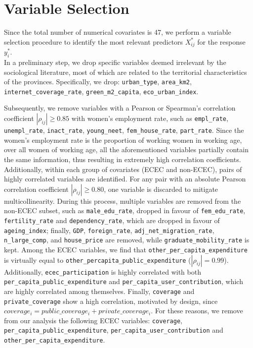 \section{Variable Selection}
\label{sec:variable_selection}

Since the total number of numerical covariates is 47, we perform a variable selection procedure to identify the most relevant predictors $X_{ij}^*$ for the response $y_i^*$.\\

In a preliminary step, we drop specific variables deemed irrelevant by the sociological literature, most of which are related to the territorial characteristics of the provinces. Specifically, we drop: \texttt{urban\_type}, \texttt{area\_km2}, \texttt{internet\_coverage\_rate}, \texttt{green\_m2\_capita}, \texttt{eco\_urban\_index}.

Subsequently, we remove variables with a Pearson or Spearman's correlation coefficient $|\rho_{ij}| \ge 0.85$ with women's employment rate, such as \texttt{empl\_rate}, \texttt{unempl\_rate}, \texttt{inact\_rate}, \texttt{young\_neet}, \texttt{fem\_house\_rate}, \texttt{part\_rate}. Since the women's employment rate is the proportion of working women in working age, over all women of working age, all the aforementioned variables partially contain the same information, thus resulting in extremely high correlation coefficients.\\

Additionally, within each group of covariates (ECEC and non-ECEC), pairs of highly correlated variables are identified. For any pair with an absolute Pearson correlation coefficient $|\rho_{ij}| \ge 0.80$, one variable is discarded to mitigate multicollinearity. During this process, multiple variables are removed from the non-ECEC subset, such as \texttt{male\_edu\_rate}, dropped in favour of \texttt{fem\_edu\_rate}, \texttt{fertility\_rate} and \texttt{dependency\_rate}, which are dropped in favour of \texttt{ageing\_index}; finally, \texttt{GDP}, \texttt{foreign\_rate}, \texttt{adj\_net\_migration\_rate}, \texttt{n\_large\_comp}, and \texttt{house\_price} are removed, while \texttt{graduate\_mobility\_rate} is kept. Among the ECEC variables, we find that \texttt{other\_per\_capita\_expenditure} is virtually equal to \texttt{other\_percapita\_public\_expenditure}  ($|\rho_{ij}| = 0.99$). Additionally, \texttt{ecec\_participation} is highly correlated with both \texttt{per\_capita\_public\_expenditure} and \texttt{per\_capita\_user\_contribution}, which are highly correlated among themselves. Finally, \texttt{coverage} and \texttt{private\_coverage} show a high correlation, motivated by design, since $coverage_i = public\_coverage_i + private\_coverage_i$. For these reasons, we remove from our analysis the following ECEC variables: \texttt{coverage}, \texttt{per\_capita\_public\_expenditure}, \texttt{per\_capita\_user\_contribution} and \texttt{other\_per\_capita\_expenditure}.\\

